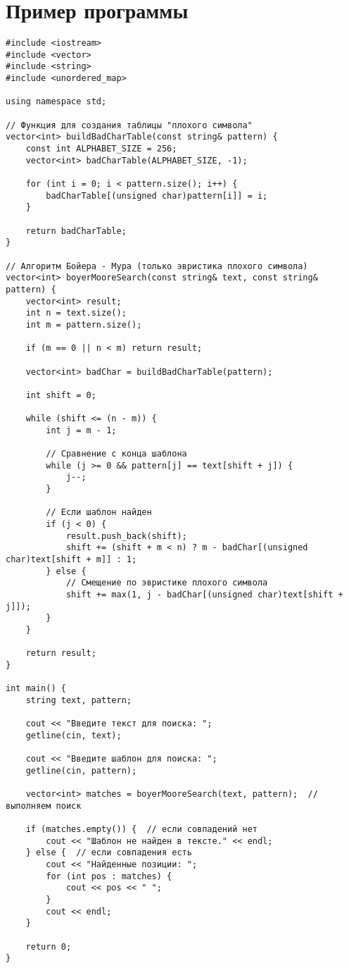 \documentclass[otchet]{SCWorks}
\begin{document}
\section{Пример программы}
\begin{verbatim}
#include <iostream>
#include <vector>
#include <string>
#include <unordered_map>

using namespace std;

// Функция для создания таблицы "плохого символа"
vector<int> buildBadCharTable(const string& pattern) {
    const int ALPHABET_SIZE = 256;
    vector<int> badCharTable(ALPHABET_SIZE, -1);

    for (int i = 0; i < pattern.size(); i++) {
        badCharTable[(unsigned char)pattern[i]] = i;
    }

    return badCharTable;
}

// Алгоритм Бойера - Мура (только эвристика плохого символа)
vector<int> boyerMooreSearch(const string& text, const string& pattern) {
    vector<int> result;
    int n = text.size();
    int m = pattern.size();

    if (m == 0 || n < m) return result;

    vector<int> badChar = buildBadCharTable(pattern);

    int shift = 0;

    while (shift <= (n - m)) {
        int j = m - 1;

        // Сравнение с конца шаблона
        while (j >= 0 && pattern[j] == text[shift + j]) {
            j--;
        }

        // Если шаблон найден
        if (j < 0) {
            result.push_back(shift);
            shift += (shift + m < n) ? m - badChar[(unsigned char)text[shift + m]] : 1;
        } else {
            // Смещение по эвристике плохого символа
            shift += max(1, j - badChar[(unsigned char)text[shift + j]]);
        }
    }

    return result;
}

int main() {
    string text, pattern;

    cout << "Введите текст для поиска: ";
    getline(cin, text);

    cout << "Введите шаблон для поиска: ";
    getline(cin, pattern); 

    vector<int> matches = boyerMooreSearch(text, pattern);  // выполняем поиск

    if (matches.empty()) {  // если совпадений нет
        cout << "Шаблон не найден в тексте." << endl;
    } else {  // если совпадения есть
        cout << "Найденные позиции: ";  
        for (int pos : matches) {  
            cout << pos << " ";  
        }
        cout << endl;
    }

    return 0; 
}
\end{verbatim}
\end{document}
